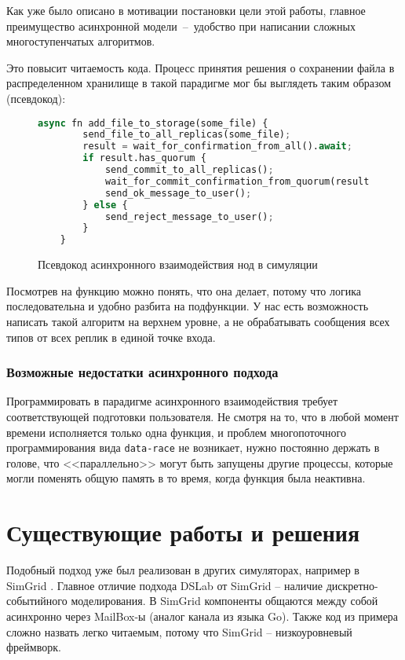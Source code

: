 Как уже было описано в мотивации постановки цели этой работы, главное преимущество асинхронной модели~--~удобство при написании сложных многоступенчатых алгоритмов.

Это повысит читаемость кода. Процесс принятия решения о сохранении файла в распределенном хранилище в такой парадигме мог бы выглядеть таким образом (псевдокод):

\begin{figure}[H]
\begin{lstlisting}[language=Python]
    async fn add_file_to_storage(some_file) {
        send_file_to_all_replicas(some_file);
        result = wait_for_confirmation_from_all().await;
        if result.has_quorum {
            send_commit_to_all_replicas();
            wait_for_commit_confirmation_from_quorum(result.nodes).await;
            send_ok_message_to_user();
        } else {
            send_reject_message_to_user();
        }
    }
\end{lstlisting}
\caption{Псевдокод асинхронного взаимодействия нод в симуляции}
\label{pseudocode}
\end{figure}

Посмотрев на функцию можно понять, что она делает, потому что логика последовательна и удобно разбита на подфункции. У нас есть возможность написать такой алгоритм на верхнем уровне, а не обрабатывать сообщения всех типов от всех реплик в единой точке входа.

\subsubsection{Возможные недостатки асинхронного подхода}

Программировать в парадигме асинхронного взаимодействия требует соответствующей подготовки пользователя. Не смотря на то, что в любой момент времени исполняется только одна функция, и проблем многопоточного программирования вида \texttt{data-race} не возникает, нужно постоянно держать в голове, что <<параллельно>> могут быть запущены другие процессы, которые могли поменять общую память в то время, когда функция была неактивна. 

\newpage 

\section{Существующие работы и решения}

Подобный подход уже был реализован в других симуляторах, например в SimGrid \cite{simgrid-example}. Главное отличие подхода DSLab от SimGrid -- наличие дискретно-событийного моделирования. В SimGrid компоненты общаются между собой асинхронно через MailBox-ы (аналог канала из языка Go). Также код из примера сложно назвать легко читаемым, потому что SimGrid -- низкоуровневый фреймворк.


